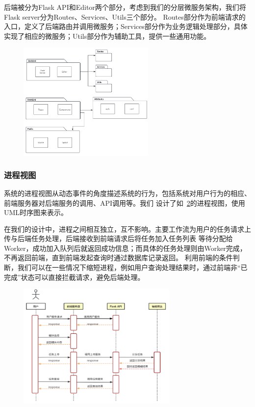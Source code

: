 后端被分为Flask API和Editor两个部分，考虑到我们的分层微服务架构，我们将Flask server分为Routes、Services、Utils三个部分。
Routes部分作为前端请求的入口，定义了后端路由并调用微服务；Services部分作为业务逻辑处理部分，具体实现了相应的微服务；Utils部分作为辅助工具，提供一些通用功能。

\begin{figure}[ht]
    \centering
    \includegraphics[width=0.6\textwidth]{source/img/system_develop.png}
    \label{fig:system-develop}
\end{figure}

\subsubsection{进程视图}

系统的进程视图从动态事件的角度描述系统的行为，包括系统对用户行为的相应、前端服务器对后端服务的调用、API调用等。我们
设计了如~\ref{fig:system-process}的进程视图，使用UML时序图来表示。

在我们的设计中，进程之间相互独立，互不影响。主要工作流为用户的任务请求上传与后端任务处理，后端接收到前端请求后将任务加入任务列表
等待分配给Worker，成功加入队列后就返回成功信息；而具体的任务处理则由Worker完成，不再返回前端，直到前端发起查询时通过数据库记录返回。
利用前端的条件判断，我们可以在一些情况下缩短进程，例如用户查询处理结果时，通过前端非“已完成”状态可以直接拦截请求，避免后端处理。

\begin{figure}[ht]
    \centering
    \includegraphics[width=0.7\textwidth]{source/img/system_process.png}
    \label{fig:system-process}
\end{figure}

